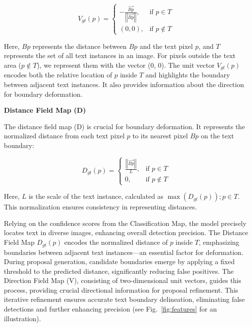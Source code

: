 \documentclass[default,iicol]{sn-jnl} %
\begin{document}
\begin{equation}
	V_{gt}(p) =
	\begin{cases}
		-\frac{\overrightarrow{Bp}}{\left|\left|\overrightarrow{Bp}\right|\right|}, & \text{if } p \in T \\
		(0, 0), & \text{if } p \notin T
	\end{cases}
\end{equation}

Here, \( Bp \) represents the distance between \( Bp \) and the text pixel \( p \), and \( T \) represents the set of all text instances in an image. For pixels outside the text area (\( p \notin T \)), we represent them with the vector (0, 0). The unit vector \( V_{gt}(p) \) encodes both the relative location of \( p \) inside \( T \) and highlights the boundary between adjacent text instances. It also provides information about the direction for boundary deformation.

\textbf{Distance Field Map (D)}

The distance field map (D) is crucial for boundary deformation. It represents the normalized distance from each text pixel \( p \) to its nearest pixel \( Bp \) on the text boundary:

\begin{equation}
	D_{gt}(p) =
	\begin{cases}
		\frac{\left|\left|\overrightarrow{Bp}\right|\right|}{L}, & \text{if } p \in T \\
		0, & \text{if } p \notin T
	\end{cases}
\end{equation}

Here, \( L \) is the scale of the text instance, calculated as \( \max(D_{gt}(p)); {p \in T} \). This normalization ensures consistency in representing distances.

Relying on the confidence scores from the Classification Map, the model precisely locates text in diverse images, enhancing overall detection precision. The Distance Field Map \( D_{gt}(p) \) encodes the normalized distance of \( p \) inside \( T \), emphasizing boundaries between adjacent text instances—an essential factor for deformation. During proposal generation, candidate boundaries emerge by applying a fixed threshold to the predicted distance, significantly reducing false positives. The Direction Field Map (V), consisting of two-dimensional unit vectors, guides this process, providing crucial directional information for proposal refinement. This iterative refinement ensures accurate text boundary delineation, eliminating false detections and further enhancing precision (see Fig.~\ref{fig:features} for an illustration).
\end{document}

